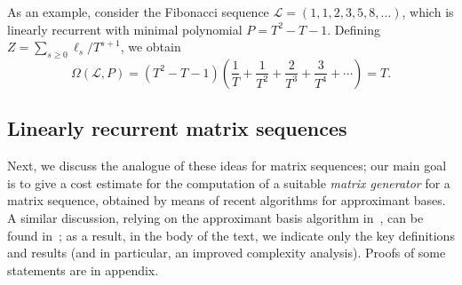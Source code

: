 \documentclass[final,1p,times,authoryear]{elsarticle}
\newcommand{\genseries}{Z}
\newcommand{\minpoly}{P}
\def\K{\mathbb{K}}
\def\K {\ensuremath{\mathbb{K}}}
\begin{document}
As an example, consider the Fibonacci sequence $\mathcal{L} =
(1,1,2,3,5,8,\dots)$, which is linearly recurrent with minimal
polynomial $P=T^2-T-1$.
Defining
$\genseries = \sum_{s\ge0} \ell_{s}/T^{s+1}$, we obtain
\[
  \Omega(\mathcal{L},P) = (T^2-T-1)\left (\frac 1T +\frac 1{T^2} + \frac
  2{T^3} + \frac 3{T^4} + \cdots \right ) =T.
\]




\subsection{Linearly recurrent matrix sequences}\label{section:matrix_seq}

Next, we discuss the analogue of these ideas for matrix sequences; our
main goal is to give a cost estimate for the computation of a suitable
{\em matrix generator} for a matrix sequence, obtained by means of
recent algorithms for approximant bases. A similar discussion, relying
on the approximant basis algorithm in~\citep{BecLab94}, can be found
in~\citep[Chapter~4]{Turner02}; as a result, in the body of the text,
we indicate only the key definitions and results (and in particular,
an improved complexity analysis). Proofs of some statements are in
appendix.
\end{document}
